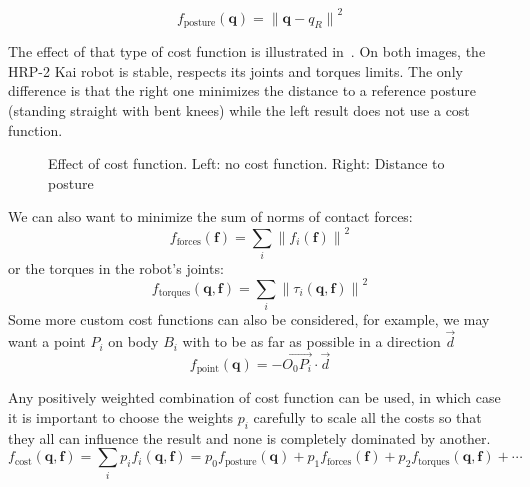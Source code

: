 \begin{equation*}
  f_\text{posture}(\mathbf{q}) = {\|\mathbf{q}-q_R\|}^2
\end{equation*}

The effect of that type of cost function is illustrated in~.
On both images, the HRP-2 Kai robot is stable, respects its joints and torques limits.
The only difference is that the right one minimizes the distance to a reference posture (standing straight with bent knees) while the left result does not use a cost function.

\begin{figure}[htpb]
  \centering
  \setlength{\fboxsep}{0pt}%
  \setlength{\fboxrule}{1pt}%
  \caption{Effect of cost function. Left: no cost function. Right: Distance to posture}
\label{fig:cost}
\end{figure}

We can also want to minimize the sum of norms of contact forces:
\begin{equation*}
  f_\text{forces}(\mathbf{f}) = \sum\limits_i {\|f_i(\mathbf{f})\|}^2
\end{equation*}
or the torques in the robot's joints:
\begin{equation*}
  f_\text{torques}(\mathbf{q},\mathbf{f}) = \sum\limits_i {\|\tau_i(\mathbf{q},\mathbf{f})\|}^2
\end{equation*}
Some more custom cost functions can also be considered, for example, we may want a point $P_i$ on body $B_i$ with to be as far as possible in a direction $\vec{d}$
\begin{equation*}
  f_\text{point} (\mathbf{q}) = -{\overrightarrow{O_0 P_i}}\cdot{\vec{d}}
\end{equation*}

Any positively weighted combination of cost function can be used, in which case it is important to choose the weights $p_i$ carefully to scale all the costs so that they all can influence the result and none is completely dominated by another.
\begin{equation}
  f_\text{cost}(\mathbf{q},\mathbf{f}) = \sum\limits_i{p_i f_i(\mathbf{q},\mathbf{f})} = p_0 f_\text{posture}(\mathbf{q}) + p_1 f_\text{forces}(\mathbf{f}) + p_2 f_\text{torques}(\mathbf{q},\mathbf{f}) + \cdots
\end{equation}



